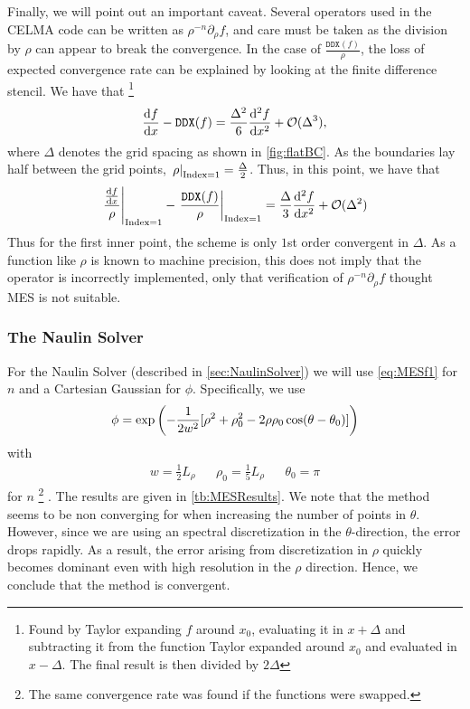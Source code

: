 Finally, we will point out an important caveat.
Several operators used in the CELMA code can be written as $\rho^{-n}\partial_\rho f$, and care must be taken as the division by $\rho$ can appear to break the convergence.
In the case of $\frac{\texttt{DDX}(f)}{\rho}$, the loss of expected convergence rate can be explained by looking at the finite difference stencil.
We have that%
%
\footnote{
Found by Taylor expanding $f$ around $x_0$, evaluating it in $x+\Delta$ and subtracting it from the function Taylor expanded around $x_0$ and evaluated in $x-\Delta$. The final result is then divided by $2\Delta$
}
%
\begin{align*}
    \frac{\text{d}{f}}{\text{d}{x}} - \texttt{DDX}(f) =
    \frac{\Delta^2}{6}\frac{\text{d}{^2f}}{\text{d}{x^2}} + \mathcal{O}(\Delta^3),
\end{align*}
%
where $\Delta$ denotes the grid spacing as shown in \cref{fig:flatBC}.
As the boundaries lay half between the grid points, $\left.\rho\right|_{\text{Index}=1}=\frac{\Delta}{2}$.
Thus, in this point, we have that
%
\begin{align*}
    \left.\frac{\frac{\text{d}{f}}{\text{d}{x}}}{\rho}\right|_{\text{Index}=1}
    - \left.\frac{\texttt{DDX}(f)}{\rho}\right|_{\text{Index}=1}
    = \frac{\Delta}{3}\frac{\text{d}{^2f}}{\text{d}{x^2}} + \mathcal{O}(\Delta^2)
\end{align*}
%
Thus for the first inner point, the scheme is only $1$st order convergent in $\Delta$.
As a function like $\rho$ is known to machine precision, this does not imply that the operator is incorrectly implemented, only that verification of $\rho^{-n}\partial_\rho f$ thought MES is not suitable.

\subsubsection{The Naulin Solver}
%
For the Naulin Solver (described in \cref{sec:NaulinSolver}) we will use \cref{eq:MESf1} for $n$ and a Cartesian Gaussian for $\phi$.
Specifically, we use
%
\begin{align}
\phi = \exp\left(-\frac{1}{2w^2}[\rho^2 + \rho_0^2 - 2\rho\rho_0\cos(\theta - \theta_0)] \right)
\label{eq:MESf2}
\end{align}
%
with
%
\begin{align*}
& w = \frac{1}{2}L_\rho &
& \rho_0 = \frac{1}{5}L_\rho &
& \theta_0 = \pi &
\end{align*}
%
for $n$%
\footnote{The same convergence rate was found if the functions were swapped.}%
.
The results are given in \cref{tb:MESResults}.
We note that the method seems to be non converging for when increasing the number of points in $\theta$.
However, since we are using an spectral discretization in the $\theta$-direction, the error drops rapidly.
As a result, the error arising from discretization in $\rho$ quickly becomes dominant even with high resolution in the $\rho$ direction.
Hence, we conclude that the method is convergent.

